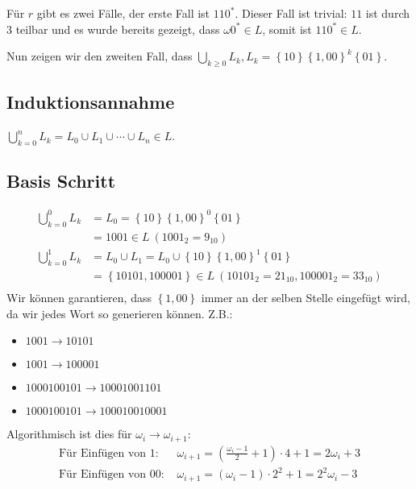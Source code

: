 \documentclass{article}
\begin{document}
\bigskip

Für $r$ gibt es zwei Fälle, der erste Fall ist $110^*$. Dieser Fall ist trivial: $11$ ist durch $3$ teilbar und es wurde bereits gezeigt, dass $\omega 0^* \in L$, somit ist $110^* \in L$.

\bigskip

Nun zeigen wir den zweiten Fall, dass $\bigcup_{k\geq 0} L_k, L_k = \left\{10\right\}\left\{1,00\right\}^k\left\{01\right\}$.

\subsection*{Induktionsannahme}
$\bigcup_{k=0}^n L_k = L_0 \cup L_1 \cup \cdots \cup L_n \in L$.

\subsection*{Basis Schritt}
\begin{align*}
\bigcup_{k=0}^0 L_k &= L_0 = \left\{10\right\}\left\{1,00\right\}^0\left\{01\right\} \\
                        &= 1001 \in L\ (1001_2 = 9_{10}) \\
\bigcup_{k=0}^1 L_k &= L_0 \cup L_1 = L_0 \cup \left\{10\right\}\left\{1,00\right\}^1\left\{01\right\} \\
                        &= \left\{10101,100001\right\} \in L\ (10101_2 = 21_{10}, 100001_2 = 33_{10}) \\
\end{align*}
Wir können garantieren, dass $\left\{1,00\right\}$ immer an der selben Stelle eingefügt wird, da wir jedes Wort so generieren können. Z.B.:
\begin{itemize}
	\item $1001 \rightarrow 10101$
	\item $1001 \rightarrow 100001$
	\item $1000100101 \rightarrow 10001001101$
	\item $1000100101 \rightarrow 100010010001$
\end{itemize}

Algorithmisch ist dies für $\omega_i \rightarrow \omega_{i+1}$:
\begin{align*}
\text{Für Einfügen von $1$: }&
\omega_{i+1} = \left(\frac{\omega_i-1}{2}+1\right)\cdot 4 +1 = 2\omega_i+3\\
\text{Für Einfügen von $00$: }&
\omega_{i+1} = \left(\omega_i-1\right)\cdot 2^2 + 1 = 2^2\omega_i-3\\
\end{align*}
\end{document}
